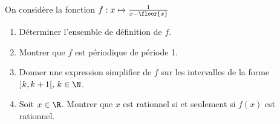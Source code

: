 
\begin{exercice}
On considère la fonction $f : x \mapsto \frac{1}{x- \floor{x}}$
\begin{enumerate}
\item Déterminer l'ensemble de définition de $f$. 
\item Montrer que $f$ est périodique de période 1. 
\item Donner une expression simplifier de $f$ sur les intervalles de la forme $]k, k+1[, \, k\in \N$. 
\item Soit $x\in \R$. Montrer que $x$ est rationnel si et seulement si $f(x)$ est rationnel. 
\end{enumerate}
\end{exercice}